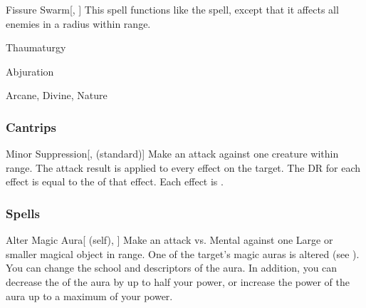 \lowercase{\hypertarget{spell:Fissure Swarm}{}}\label{spell:Fissure Swarm}
\begin{apability}[\nth{6}]{\hypertarget{spell:Fissure Swarm}{Fissure Swarm}}[, ]
This spell functions like the  spell, except that it affects all enemies in a \areamed radius within \rngmed range.
\end{apability}
\vspace{0.25em}


\newpage
\begin{spellsection}{Thaumaturgy}

\begin{spellheader}
\end{spellheader}


 Abjuration

 Arcane, Divine, Nature

\subsubsection{Cantrips}


\begin{freeability}{Minor Suppression}[,  (standard)]
Make an attack against one creature within \rngmed range.
The attack result is applied to every  effect on the target.
The DR for each effect is equal to the  of that effect.
\hit Each effect is .
\end{freeability}

\end{spellsection}


\subsubsection{Spells}


\lowercase{\hypertarget{spell:Alter Magic Aura}{}}\label{spell:Alter Magic Aura}
\begin{attuneability}[\nth{1}]{\hypertarget{spell:Alter Magic Aura}{Alter Magic Aura}}[ (self), ]
Make an attack vs. Mental against one Large or smaller magical object in \rngmed range.
\hit One of the target's magic auras is altered (see ).
You can change the school and descriptors of the aura.
In addition, you can decrease the  of the aura by up to half your power, or increase the power of the aura up to a maximum of your power.
\end{attuneability}
\vspace{0.25em}



